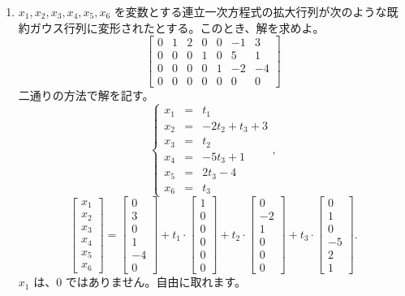 \begin{enumerate}
\item $x_1, x_2, x_3, x_4, x_5, x_6$ を変数とする連立一次方程式の拡大行列が次のような既約ガウス行列に変形されたとする。このとき、解を求めよ。
$$\left[\begin{array}{ccccccc}
0 & 1 & 2 & 0 & 0 & -1 & 3\\
0 & 0 & 0 & 1 & 0 & 5 & 1\\
0 & 0 & 0 & 0 & 1 & -2 & -4\\
0 & 0 & 0 & 0 & 0 & 0 & 0
\end{array}\right]$$
\sol
二通りの方法で解を記す。
$$\left\{\begin{array}{ccl}
x_1 & = & t_1\\ x_2 & = &-2t_2 + t_3 + 3\\
x_3 & = & t_2 \\ x_4 & = & -5t_3 + 1\\
x_5 & = & 2t_3 - 4\\ x_6 & = &t_3
\end{array}\right.,$$
$$\left[\begin{array}{c}
x_1 \\ x_2 \\ x_3 \\ x_4 \\ x_5 \\ x_6\end{array}\right] = 
\left[\begin{array}{c}
0 \\ 3 \\ 0 \\ 1 \\ -4 \\ 0\end{array}\right] + 
t_1\cdot
\left[\begin{array}{c}
1 \\ 0 \\ 0 \\ 0 \\ 0 \\0\end{array}\right] + 
t_2\cdot
\left[\begin{array}{c}
0 \\ -2 \\ 1 \\ 0 \\ 0 \\ 0\end{array}\right] +
t_3\cdot
\left[\begin{array}{c}
0 \\ 1 \\ 0 \\ -5 \\ 2 \\ 1\end{array}\right].$$
$x_1$ は、$0$ ではありません。自由に取れます。


\end{enumerate}
